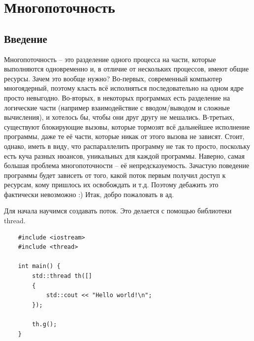 \documentclass[12pt, a4paper]{article}
\begin{document}
\section{Многопоточность}
\subsection{Введение}
Многопоточность -- это разделение одного процесса на части, которые выполняются одновременно и, в отличие от нескольких процессов, имеют общие ресурсы. Зачем это вообще нужно? Во-первых, современный компьютер многоядерный, поэтому класть всё исполняться последовательно на одном ядре просто невыгодно. Во-вторых, в некоторых программах есть разделение на логические части (например взаимодействие с вводом/выводом и сложные вычисления), и хотелось бы, чтобы они друг другу не мешались. В-третьих, существуют блокирующие вызовы, которые тормозят всё дальнейшее исполнение программы, даже те её части, которые никак от этого вызова не зависят. Стоит, однако, иметь в виду, что распараллелить программу не так то просто, поскольку есть куча разных нюансов, уникальных для каждой программы. 
Наверно, самая большая проблема многопоточности -- её непредсказуемость. Зачастую поведение программы будет зависеть от того, какой поток первым получил доступ к ресурсам, кому пришлось их освобождать и т.д. Поэтому дебажить это фактически невозможно :) Итак, добро пожаловать в ад.
\par Для начала научимся создавать поток. Это делается с помощью библиотеки thread.
\begin{verbatim}
	#include <iostream>
	#include <thread>
	
	int main() {
		std::thread th([]
		{
			std::cout << "Hello world!\n";
		});
		
		th.g();
	}
\end{verbatim}
\end{document}
